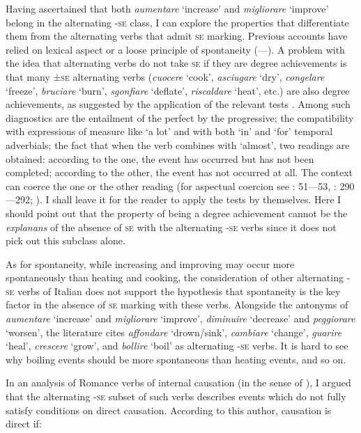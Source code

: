 \documentclass[output=paper,colorlinks,citecolor=brown
]{langscibook}
\begin{document}
Having ascertained that both \textit{aumentare} ‘increase’ and \textit{migliorare} ‘improve’ belong in the alternating -\textsc{se} class, I can explore the properties that differentiate them from the alternating verbs that admit \textsc{se} marking. Previous accounts have relied on lexical aspect or a loose principle of spontaneity (—). A problem with the idea that alternating verbs do not take \textsc{se} if they are degree achievements is that many ±\textsc{se} alternating verbs (\textit{cuocere} ‘cook’, \textit{asciugare} ‘dry’, \textit{congelare} ‘freeze’, \textit{bruciare} ‘burn’, \textit{sgonfiare} ‘deflate’, \textit{riscaldare} ‘heat’, etc.) are also degree achievements, as suggested by the application of the relevant tests \citep{dowty1979word,bertinetto1995attempt,hay1999scalar}. Among such diagnostics are the entailment of the perfect by the progressive; the compatibility with expressions of measure like ‘a lot’ and with both ‘in’ and ‘for’ temporal adverbials; the fact that when the verb combines with ‘almost’, two readings are obtained: according to the one, the event has occurred but has not been completed; according to the other, the event has not occurred at all. The context can coerce the one or the other reading (for aspectual coercion see \cite{jackendoff1997architecture}: 51—53, \cite{jackendoff2002foundations}: 290—292; \cite{pustejovsky1991syntax}). I shall leave it for the reader to apply the tests by themselves. Here I should point out that the property of being a degree achievement cannot be the \textit{explanans} of the absence of \textsc{se} with the alternating -\textsc{se} verbs since it does not pick out this subclass alone. 

As for spontaneity, while increasing and improving may occur more spontaneously than heating and cooking, the consideration of other alternating -\textsc{se} verbs of Italian does not support the hypothesis that spontaneity is the key factor in the absence of \textsc{se} marking with these verbs. Alongside the antonyms of \textit{aumentare} ‘increase’ and \textit{migliorare} ‘improve’, \textit{diminuire} ‘decrease’ and \textit{peggiorare} ‘worsen’, the literature cites \textit{affondare} ‘drown/sink’, \textit{cambiare} ‘change’, \textit{guarire} ‘heal’, \textit{crescere} ‘grow’, and \textit{bollire} ‘boil’ as alternating -\textsc{se} verbs. It is hard to see why boiling events should be more spontaneous than heating events, and so on.

In an analysis of Romance verbs of internal causation (in the sense of \cite{levin1995unaccusativity}), I argued that the alternating -\textsc{se} subset of such verbs describes events which do not fully satisfy  conditions on direct causation. According to this author, causation is direct if:
\end{document}

